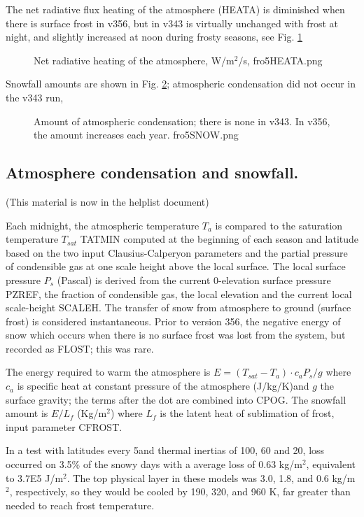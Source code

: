 \documentclass{article}
\begin{document}
The net radiative flux heating of the atmosphere (HEATA) is diminished when there is surface frost in v356, but in v343 is virtually unchanged with frost at night, and slightly increased at noon during frosty seasons, see Fig. \ref{fro5HEATA}
\begin{figure}[!ht] 
\caption[Run1 results for net heating of the atmosphere]{Net radiative heating
  of the atmosphere, W/m$^2$/s,
\label{fro5HEATA}  fro5HEATA.png }
\end{figure} 

Snowfall amounts are shown in Fig. \ref{fro5SNOW}; atmospheric condensation did not occur in the v343 run, 
\begin{figure}[!ht] 
\caption[Run1 results for atmospheric condensation]{Amount of atmospheric condensation; there is none in v343. In v356, the amount increases each year.
\label{fro5SNOW}  fro5SNOW.png }
\end{figure} 

\subsection{Atmosphere condensation and snowfall. \label{snows} } %
(This material is now in the helplist document)

 Each midnight, the atmospheric temperature $T_a$ is compared to the saturation
 temperature $T_{sat}$ TATMIN computed at the beginning of each season and
 latitude based on the two input Clausius-Calperyon parameters and the partial
 pressure of condensible gas at one scale height above the local surface. The
 local surface pressure $P_s$ (Pascal) is derived from the current 0-elevation
 surface pressure PZREF, the fraction of condensible gas, the local elevation
 and the current local scale-height SCALEH. The transfer of snow from atmosphere
 to ground (surface frost) is considered instantaneous. Prior to version 356,
 the negative energy of snow which occurs when there is no surface frost was lost
 from the system, but recorded as FLOST; this was rare.

 The energy required to warm the atmosphere is $E= (T_{sat}-T_a) \cdot c_a
 P_s/g$ where $c_a$ is specific heat at constant pressure of the atmosphere
 (J/kg/K)and $g$ the surface gravity; the terms after the dot are combined into
 CPOG. The snowfall amount is $E/L_f$ (Kg/m$^2$) where $L_f$ is the latent heat of
 sublimation of frost, input parameter CFROST.

 In a test with latitudes every 5\qd and thermal inertias of 100, 60 and 20,
 loss occurred on 3.5\% of the snowy days with a average loss of 0.63 kg/m$^2$,
 equivalent to 3.7E5 J/m$^2$. The top physical layer in these models was 3.0,
 1.8, and 0.6 kg/m$^2$, respectively, so they would be cooled by 190, 320, and
 960 K, far greater than needed to reach frost temperature.
\end{document}
